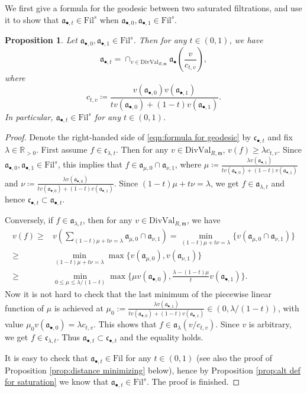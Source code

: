 \documentclass[11pt, leqno]{amsart}%
\theoremstyle{plain}
\newtheorem{proposition}[theorem]{Proposition}
\theoremstyle{definition}
\theoremstyle{remark}
\newcommand{\bR}{\mathbb{R}}
\newcommand{\fa}{\mathfrak{a}}
\newcommand{\fc}{\mathfrak{c}}
\newcommand{\fm}{\mathfrak{m}}
\newcommand{\DivVal}{\mathrm{DivVal}}
\newcommand{\Fil}{\mathrm{Fil}}
\numberwithin{equation}{section}
\begin{document}
We first give a formula for the geodesic between two saturated filtrations, and use it to show that $\fa_{\bullet,t}\in\Fil^s$ when $\fa_{\bullet,0},\fa_{\bullet,1}\in\Fil^s$.

\begin{proposition}\label{prop:saturated geodesic is saturated}
    Let $\fa_{\bullet,0},\fa_{\bullet,1}\in\Fil^s$. Then for any $t\in(0,1)$, we have
    \begin{equation}\label{eqn:formula for geodesic}
        \fa_{\bullet,t}=\cap_{v\in\DivVal_{R,\fm}}\fa_\bullet(\frac{v}{c_{t,v}}),
    \end{equation}
    where 
    \[
        c_{t,v}\coloneqq\frac{v(\fa_{\bullet,0})v(\fa_{\bullet,1})}{tv(\fa_{\bullet,0})+(1-t)v(\fa_{\bullet,1})}.
    \]
    In particular, $\fa_{\bullet,t}\in\Fil^s$ for any $t\in(0,1)$.
\end{proposition}

\begin{proof}
    Denote the right-handed side of \eqref{eqn:formula for geodesic} by $\fc_{\bullet,t}$ and fix $\lambda\in\bR_{>0}$. First assume $f\in\fc_{\lambda,t}$. Then for any $v\in\DivVal_{R,\fm}$, $v(f)\ge \lambda c_{t,v}$. Since $\fa_{\bullet,0},\fa_{\bullet,1}\in\Fil^s$, this implies that $f\in\fa_{\mu,0}\cap\fa_{\nu,1}$, where $\mu\coloneqq \frac{\lambda v(\fa_{\bullet,1})}{tv(\fa_{\bullet,0})+(1-t)v(\fa_{\bullet,1})}$ and $\nu\coloneqq \frac{\lambda v(\fa_{\bullet,0})}{tv(\fa_{\bullet,0})+(1-t)v(\fa_{\bullet,1})}$. Since $(1-t)\mu+t\nu=\lambda$, we get $f\in\fa_{\lambda,t}$ and hence $\fc_{\bullet,t}\subset\fa_{\bullet,t}$.
	
    Conversely, if $f\in\fa_{\lambda,t}$, then for any $v\in\DivVal_{R,\fm}$, we have
    \begin{align*}
        v(f)\ge &v\left(\sum_{(1-t)\mu+t\nu=\lambda}\fa_{\mu,0}\cap\fa_{\nu,1}\right)=\min_{(1-t)\mu+t\nu=\lambda}\{v(\fa_{\mu,0}\cap\fa_{\nu,1})\}\\
        \ge&\min_{(1-t)\mu+t\nu=\lambda}\max\{v(\fa_{\mu,0}),v(\fa_{\nu,1})\}\\
        \ge&\min_{0\le\mu\le\lambda/(1-t)}\max\{\mu v(\fa_{\bullet,0}),\frac{\lambda-(1-t)\mu}{t}v(\fa_{\bullet,1})\}.
    \end{align*}
    Now it is not hard to check that the last minimum of the piecewise linear function of $\mu$ is achieved at $\mu_0:=\frac{\lambda v(\fa_{\bullet,1})}{tv(\fa_{\bullet,0})+(1-t)v(\fa_{\bullet,1})}\in(0,\lambda/(1-t))$, with value $\mu_0v(\fa_{\bullet,0})=\lambda c_{t,v}$. This shows that $f\in\fa_\lambda(v/c_{t,v})$. Since $v$ is arbitrary, we get $f\in\fc_{\lambda,t}$. Thus $\fa_{\bullet,t}\subset\fc_{\bullet,t}$ and the equality holds.
	
    It is easy to check that $\fa_{\bullet,t}\in\Fil$ for any $t\in(0,1)$ (see also the proof of Proposition \ref{prop:distance minimizing} below), hence by Proposition \ref{prop:alt def for saturation} we know that $\fa_{\bullet,t}\in\Fil^s$. The proof is finished.
\end{proof}
\end{document}
